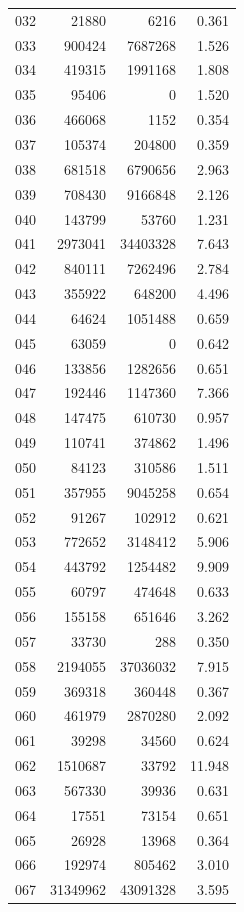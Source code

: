 \documentclass[anonymous,notoc]{gmcm2026}
\begin{document}
\begin{longtable}{lrrr}
032 & 21880 & 6216 & 0.361 \\
033 & 900424 & 7687268 & 1.526 \\
034 & 419315 & 1991168 & 1.808 \\
035 & 95406 & 0 & 1.520 \\
036 & 466068 & 1152 & 0.354 \\
037 & 105374 & 204800 & 0.359 \\
038 & 681518 & 6790656 & 2.963 \\
039 & 708430 & 9166848 & 2.126 \\
040 & 143799 & 53760 & 1.231 \\
041 & 2973041 & 34403328 & 7.643 \\
042 & 840111 & 7262496 & 2.784 \\
043 & 355922 & 648200 & 4.496 \\
044 & 64624 & 1051488 & 0.659 \\
045 & 63059 & 0 & 0.642 \\
046 & 133856 & 1282656 & 0.651 \\
047 & 192446 & 1147360 & 7.366 \\
048 & 147475 & 610730 & 0.957 \\
049 & 110741 & 374862 & 1.496 \\
050 & 84123 & 310586 & 1.511 \\
051 & 357955 & 9045258 & 0.654 \\
052 & 91267 & 102912 & 0.621 \\
053 & 772652 & 3148412 & 5.906 \\
054 & 443792 & 1254482 & 9.909 \\
055 & 60797 & 474648 & 0.633 \\
056 & 155158 & 651646 & 3.262 \\
057 & 33730 & 288 & 0.350 \\
058 & 2194055 & 37036032 & 7.915 \\
059 & 369318 & 360448 & 0.367 \\
060 & 461979 & 2870280 & 2.092 \\
061 & 39298 & 34560 & 0.624 \\
062 & 1510687 & 33792 & 11.948 \\
063 & 567330 & 39936 & 0.631 \\
064 & 17551 & 73154 & 0.651 \\
065 & 26928 & 13968 & 0.364 \\
066 & 192974 & 805462 & 3.010 \\
067 & 31349962 & 43091328 & 3.595 \\

\end{longtable}
\end{document}
